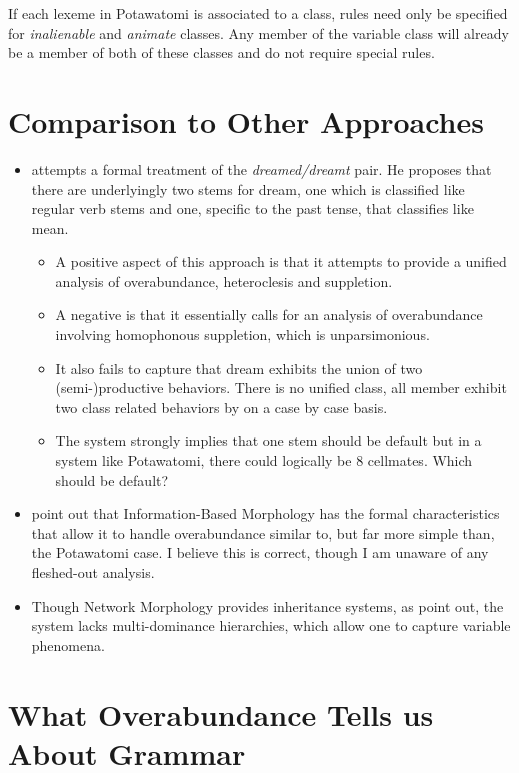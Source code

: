 If each lexeme in Potawatomi is associated to a class, rules need only
be specified for {\it inalienable} and {\it animate} classes. Any
member of the variable class will already be a member of both of these
classes and do not require special rules.

\section{Comparison to Other Approaches
}
\begin{itemize}
\item \citet{stump2016inflectional} attempts a formal treatment of the
  {\it dreamed/dreamt} pair. He proposes that there are underlyingly
  two stems for {\sc dream}, one which is classified like regular verb
  stems and one, specific to the past tense, that classifies like {\sc
    mean}.
  \begin{itemize}
  \item A positive aspect of this approach is that it attempts to
    provide a unified analysis of overabundance, heteroclesis and
    suppletion.
  \item A negative is that it essentially calls for an analysis of
    overabundance involving homophonous suppletion, which is
    unparsimonious.
  \item It also fails to capture that {\sc dream} exhibits the union
    of two (semi-)productive behaviors. There is no unified class, all
    member exhibit two class related behaviors by on a case by case
    basis.
  \item The system strongly implies that one stem should be default
    but in a system like Potawatomi, there could logically be 8
    cellmates. Which should be default?
  \end{itemize}
\item \citep{naranjo2016overabundance} point out that
  Information-Based Morphology has the formal characteristics that
  allow it to handle overabundance similar to, but far more simple
  than, the Potawatomi case. I believe this is correct, though I am
  unaware of any fleshed-out analysis.
\item Though Network Morphology \citep{brown2012network} provides
  inheritance systems, as \citet{crysmann2016variable} point out, the
  system lacks multi-dominance hierarchies, which allow one to capture
  variable phenomena.
\end{itemize}

\section{What Overabundance Tells us About Grammar}

